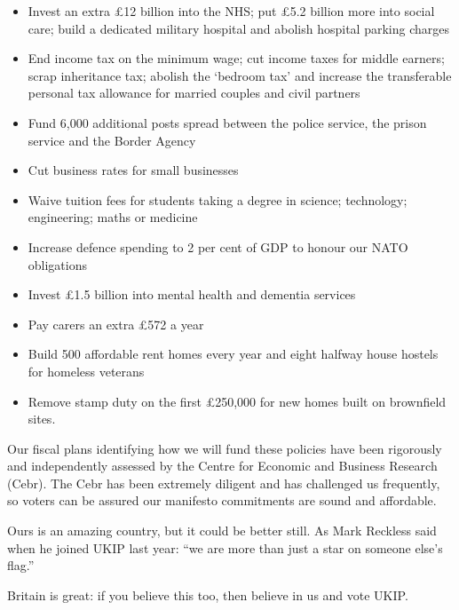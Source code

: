 \documentclass[11pt, a4paper]{article}
\begin{document}
\begin{itemize}

\item Invest an extra \pounds 12 billion into the NHS; put \pounds 5.2 billion more into social care; build a dedicated military hospital and abolish hospital parking charges
\item End income tax on the minimum wage; cut income taxes for middle earners; scrap inheritance tax; abolish the ‘bedroom tax’ and increase the transferable personal tax allowance for married couples and civil partners
\item Fund 6,000 additional posts spread between the police service, the prison service and the Border Agency
\item Cut business rates for small businesses
\item Waive tuition fees for students taking a degree in science; technology; engineering; maths or medicine
\item Increase defence spending to 2 per cent of GDP to honour our NATO obligations
\item Invest \pounds 1.5 billion into mental health and dementia services
\item Pay carers an extra \pounds 572 a year
\item Build 500 affordable rent homes every year and eight halfway house hostels for homeless veterans
\item Remove stamp duty on the first \pounds 250,000 for new homes built on brownfield sites.

\end{itemize}

Our fiscal plans identifying how we will fund these policies have been rigorously and independently assessed by the Centre for Economic and Business Research (Cebr). The Cebr has been extremely diligent and has challenged us frequently, so voters can be assured our manifesto commitments are sound and affordable.

Ours is an amazing country, but it could be better still. As Mark Reckless said when he joined UKIP last year: ``we are more than just a star on someone else’s flag.''

Britain is great: if you believe this too, then believe in us and vote UKIP.
\end{document}
